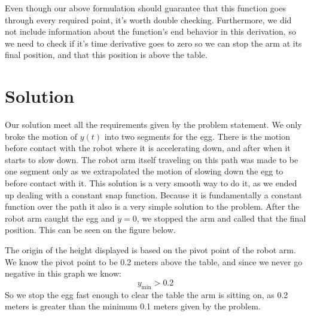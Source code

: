 \documentclass[nofoot,pdf-a,balance,colorlinks,upint,subscriptcorrection,varvw,mathalfa=cal=boondoxo]{asmeconf}
\begin{document}
    Even though our above formulation should guarantee that this function goes through every required point, it's worth double checking. Furthermore, we did not include information about the function's end behavior in this derivation, so we need to check if it's time derivative goes to zero so we can stop the arm at its final position, and that this position is above the table.

	 
	\section*{Solution}
	
    Our solution meet all the requirements given by the problem statement. We only broke the motion of $y\left(t\right)$ into two segments for the egg. There is the motion before contact with the robot where it is accelerating down, and after when it starts to slow down. The robot arm itself traveling on this path was made to be one segment only as we extrapolated the motion of slowing down the egg to before contact with it. This solution is a very smooth way to do it, as we ended up dealing with a constant snap function. Because it is fundamentally a constant function over the path it also is a very simple solution to the problem. After the robot arm caught the egg and $\dot{y} = 0$, we stopped the arm and called that the final position. This can be seen on the figure below.\newline


	
	The origin of the height displayed is based on the pivot point of the robot arm. We know the pivot point to be 0.2 meters above the table, and since we never go negative in this graph we know:
	\begin{equation}
	y_{\textrm{min}} > 0.2
	\end{equation}
	So we stop the egg fast enough to clear the table the arm is sitting on, as 0.2 meters is greater than the minimum 0.1 meters given by the problem.
\end{document}

